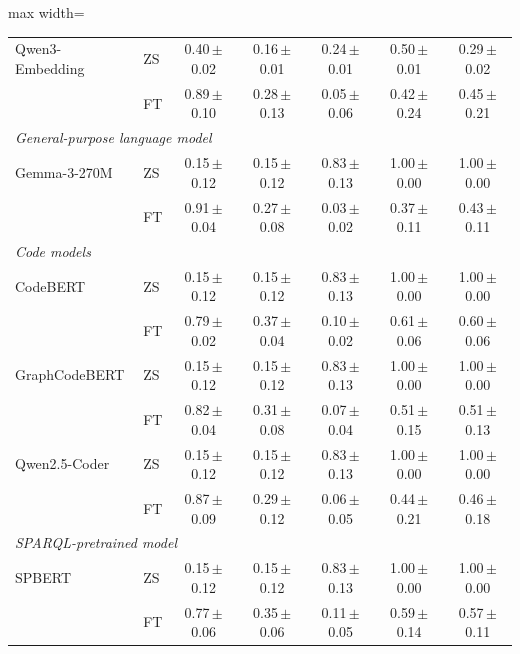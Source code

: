 \begin{table}[p]
\begin{adjustbox}{max width=\textwidth}
\begin{tabular}{ll ccccc}
Qwen3-Embedding & ZS & 0.40\,{\scriptsize$\pm$0.02} & 0.16\,{\scriptsize$\pm$0.01} & 0.24\,{\scriptsize$\pm$0.01} & 0.50\,{\scriptsize$\pm$0.01} & 0.29\,{\scriptsize$\pm$0.02}\\
 & FT & 0.89\,{\scriptsize$\pm$0.10} & 0.28\,{\scriptsize$\pm$0.13} & 0.05\,{\scriptsize$\pm$0.06} & 0.42\,{\scriptsize$\pm$0.24} & 0.45\,{\scriptsize$\pm$0.21}\\
\midrule
\multicolumn{7}{l}{\textit{General-purpose language model}}\\
Gemma-3-270M & ZS & 0.15\,{\scriptsize$\pm$0.12} & 0.15\,{\scriptsize$\pm$0.12} & 0.83\,{\scriptsize$\pm$0.13} & 1.00\,{\scriptsize$\pm$0.00} & 1.00\,{\scriptsize$\pm$0.00}\\
 & FT & 0.91\,{\scriptsize$\pm$0.04} & 0.27\,{\scriptsize$\pm$0.08} & 0.03\,{\scriptsize$\pm$0.02} & 0.37\,{\scriptsize$\pm$0.11} & 0.43\,{\scriptsize$\pm$0.11}\\
\midrule
\multicolumn{7}{l}{\textit{Code models}}\\
CodeBERT & ZS & 0.15\,{\scriptsize$\pm$0.12} & 0.15\,{\scriptsize$\pm$0.12} & 0.83\,{\scriptsize$\pm$0.13} & 1.00\,{\scriptsize$\pm$0.00} & 1.00\,{\scriptsize$\pm$0.00}\\
 & FT & 0.79\,{\scriptsize$\pm$0.02} & 0.37\,{\scriptsize$\pm$0.04} & 0.10\,{\scriptsize$\pm$0.02} & 0.61\,{\scriptsize$\pm$0.06} & 0.60\,{\scriptsize$\pm$0.06}\\
GraphCodeBERT & ZS & 0.15\,{\scriptsize$\pm$0.12} & 0.15\,{\scriptsize$\pm$0.12} & 0.83\,{\scriptsize$\pm$0.13} & 1.00\,{\scriptsize$\pm$0.00} & 1.00\,{\scriptsize$\pm$0.00}\\
 & FT & 0.82\,{\scriptsize$\pm$0.04} & 0.31\,{\scriptsize$\pm$0.08} & 0.07\,{\scriptsize$\pm$0.04} & 0.51\,{\scriptsize$\pm$0.15} & 0.51\,{\scriptsize$\pm$0.13}\\
Qwen2.5-Coder & ZS & 0.15\,{\scriptsize$\pm$0.12} & 0.15\,{\scriptsize$\pm$0.12} & 0.83\,{\scriptsize$\pm$0.13} & 1.00\,{\scriptsize$\pm$0.00} & 1.00\,{\scriptsize$\pm$0.00}\\
 & FT & 0.87\,{\scriptsize$\pm$0.09} & 0.29\,{\scriptsize$\pm$0.12} & 0.06\,{\scriptsize$\pm$0.05} & 0.44\,{\scriptsize$\pm$0.21} & 0.46\,{\scriptsize$\pm$0.18}\\
\midrule
\multicolumn{7}{l}{\textit{SPARQL-pretrained model}}\\
SPBERT & ZS & 0.15\,{\scriptsize$\pm$0.12} & 0.15\,{\scriptsize$\pm$0.12} & 0.83\,{\scriptsize$\pm$0.13} & 1.00\,{\scriptsize$\pm$0.00} & 1.00\,{\scriptsize$\pm$0.00}\\
 & FT & 0.77\,{\scriptsize$\pm$0.06} & 0.35\,{\scriptsize$\pm$0.06} & 0.11\,{\scriptsize$\pm$0.05} & 0.59\,{\scriptsize$\pm$0.14} & 0.57\,{\scriptsize$\pm$0.11}\\
\bottomrule
\end{tabular}
\end{adjustbox}
\end{table}
